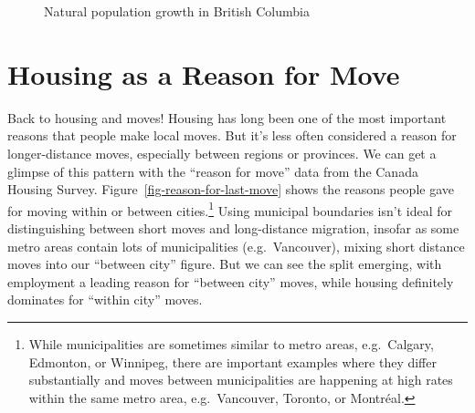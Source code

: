 \documentclass[
  letterpaper,
]{article}
\begin{document}
\begin{figure}[H]


\caption{\label{fig-natural-population-growth}Natural population growth
in British Columbia}

\end{figure}%

\section{Housing as a Reason for
Move}\label{housing-as-a-reason-for-move}

Back to housing and moves! Housing has long been one of the most
important reasons that people make local moves. But it's less often
considered a reason for longer-distance moves, especially between
regions or provinces. We can get a glimpse of this pattern with the
``reason for move'' data from the Canada Housing Survey.
Figure~\ref{fig-reason-for-last-move} shows the reasons people gave for
moving within or between cities.\footnote{While municipalities are
  sometimes similar to metro areas, e.g.~Calgary, Edmonton, or Winnipeg,
  there are important examples where they differ substantially and moves
  between municipalities are happening at high rates within the same
  metro area, e.g.~Vancouver, Toronto, or Montréal.} Using municipal
boundaries isn't ideal for distinguishing between short moves and
long-distance migration, insofar as some metro areas contain lots of
municipalities (e.g.~Vancouver), mixing short distance moves into our
``between city'' figure. But we can see the split emerging, with
employment a leading reason for ``between city'' moves, while housing
definitely dominates for ``within city'' moves.
\end{document}
